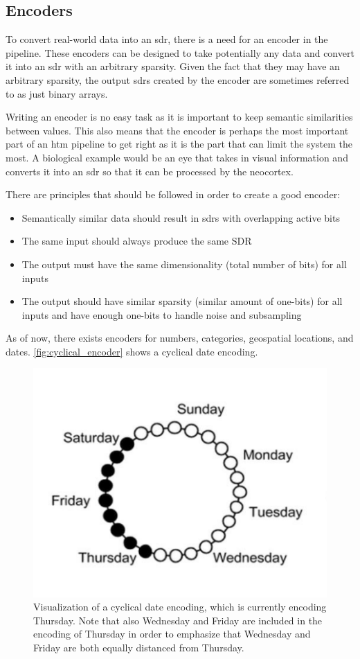 \subsection{Encoders}
\label{sec:encoders}
To convert real-world data into an \gls*{sdr}, there is a need for an encoder in the pipeline. These encoders can be designed to take potentially any data and convert it into an \gls*{sdr} with an arbitrary sparsity. Given the fact that they may have an arbitrary sparsity, the output \glspl*{sdr} created by the encoder are sometimes referred to as just binary arrays.\par
Writing an encoder is no easy task as it is important to keep semantic similarities between values. This also means that the encoder is perhaps the most important part of an \gls*{htm} pipeline to get right as it is the part that can limit the system the most. A biological example would be an eye that takes in visual information and converts it into an \gls*{sdr} so that it can be processed by the neocortex.
\par
There are principles that should be followed in order to create a good encoder:
\begin{itemize}
    \item Semantically similar data should result in \glspl*{sdr} with overlapping active bits
    \item The same input should always produce the same SDR
    \item The output must have the same dimensionality (total number of bits) for all inputs
    \item The output should have similar sparsity (similar amount of one-bits) for all inputs and have enough one-bits to handle noise and subsampling
\end{itemize}
As of now, there exists encoders for numbers, categories, geospatial locations, and dates. \autoref{fig:cyclical_encoder} shows a cyclical date encoding.
\begin{figure}[H]
    \centering
    \includegraphics[width=0.9\linewidth]{resources/related_works/cyclical_encoder}
    \caption[Cyclical Date Encoding]{Visualization of a cyclical date encoding, which is currently encoding Thursday. Note that also Wednesday and Friday are included in the encoding of Thursday in order to emphasize that Wednesday and Friday are both equally distanced from Thursday.}
    \label{fig:cyclical_encoder}
\end{figure}
